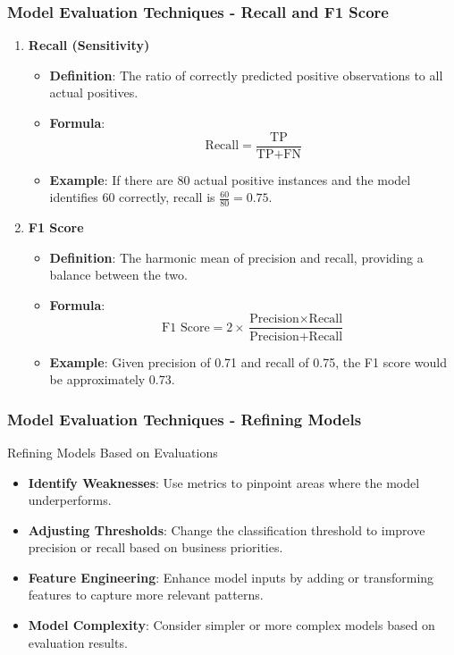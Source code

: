 \documentclass[aspectratio=169]{beamer}
\begin{document}
\begin{frame}[fragile]
    \frametitle{Model Evaluation Techniques - Recall and F1 Score}
    \begin{enumerate}[resume]
        \item \textbf{Recall (Sensitivity)}
        \begin{itemize}
            \item \textbf{Definition}: The ratio of correctly predicted positive observations to all actual positives.
            \item \textbf{Formula}:
            \begin{equation}
                \text{Recall} = \frac{\text{TP}}{\text{TP} + \text{FN}}
            \end{equation}
            \item \textbf{Example}: If there are 80 actual positive instances and the model identifies 60 correctly, recall is \( \frac{60}{80} = 0.75 \).
        \end{itemize}

        \item \textbf{F1 Score}
        \begin{itemize}
            \item \textbf{Definition}: The harmonic mean of precision and recall, providing a balance between the two.
            \item \textbf{Formula}:
            \begin{equation}
                \text{F1 Score} = 2 \times \frac{\text{Precision} \times \text{Recall}}{\text{Precision} + \text{Recall}}
            \end{equation}
            \item \textbf{Example}: Given precision of 0.71 and recall of 0.75, the F1 score would be approximately 0.73.
        \end{itemize}
    \end{enumerate}
\end{frame}

\begin{frame}[fragile]
    \frametitle{Model Evaluation Techniques - Refining Models}
    \begin{block}{Refining Models Based on Evaluations}
        \begin{itemize}
            \item \textbf{Identify Weaknesses}: Use metrics to pinpoint areas where the model underperforms.
            \item \textbf{Adjusting Thresholds}: Change the classification threshold to improve precision or recall based on business priorities.
            \item \textbf{Feature Engineering}: Enhance model inputs by adding or transforming features to capture more relevant patterns.
            \item \textbf{Model Complexity}: Consider simpler or more complex models based on evaluation results.
        \end{itemize}
    \end{block}
\end{frame}
\end{document}
